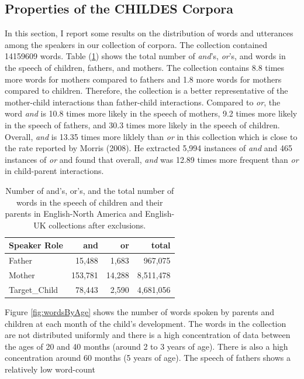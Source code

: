 \documentclass[oneside]{report}
\theoremstyle{definition}
\theoremstyle{definition}
\theoremstyle{definition}
\theoremstyle{remark}
\begin{document}
\subsection{Properties of the CHILDES
Corpora}\label{properties-of-the-childes-corpora}

In this section, I report some results on the distribution of words and
utterances among the speakers in our collection of corpora. The
collection contained 14159609 words. Table (\ref{tab:countTable}) shows
the total number of \emph{and}'s, \emph{or}'s, and words in the speech
of children, fathers, and mothers. The collection contains 8.8 times
more words for mothers compared to fathers and 1.8 more words for
mothers compared to children. Therefore, the collection is a better
representative of the mother-child interactions than father-child
interactions. Compared to \emph{or}, the word \emph{and} is 10.8 times
more likely in the speech of mothers, 9.2 times more likely in the
speech of fathers, and 30.3 times more likely in the speech of children.
Overall, \emph{and} is 13.35 times more liklely than \emph{or} in this
collection which is close to the rate reported by Morris (2008). He
extracted 5,994 instances of \emph{and} and 465 instances of \emph{or}
and found that overall, \emph{and} was 12.89 times more frequent than
\emph{or} in child-parent interactions.
\begin{table}

\caption{\label{tab:countTable}Number of and's, or's, and the total number of words in the speech of children and their parents in English-North America and English-UK collections after exclusions.}
\centering
\begin{tabular}[t]{l|r|r|r}
\hline
Speaker Role & and & or & total\\
\hline
Father & 15,488 & 1,683 & 967,075\\
\hline
Mother & 153,781 & 14,288 & 8,511,478\\
\hline
Target\_Child & 78,443 & 2,590 & 4,681,056\\
\hline
\end{tabular}
\end{table}
Figure \ref{fig:wordsByAge} shows the number of words spoken by parents
and children at each month of the child's development. The words in the
collection are not distributed uniformly and there is a high
concentration of data between the ages of 20 and 40 months (around 2 to
3 years of age). There is also a high concentration around 60 months (5
years of age). The speech of fathers shows a relatively low word-count
\end{document}
